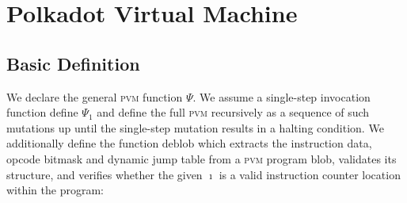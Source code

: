 \section{Polkadot Virtual Machine}\label{sec:virtualmachine}


\subsection{Basic Definition}
\newcommand*{\instr}[1]{\text{{\small \texttt{#1}}}}
\newcommand*{\regs}{\sequence[13]{\pvmreg}}
\newcommand*{\reg}{{\registers}}
\newcommand*{\mem}{{\memory}}
\newcommand*{\memr}{\cyclic{\mem}}
\newcommand*{\memwr}{\cyclic{\mem'}}
\newcommand*{\continue}{\blacktriangleright}
\newcommand*{\instrlen}{\ell}
\newcommand*{\revbitsfunc}[1]{\overleftarrow{\fnoctetstobits}_{#1}}
\newcommand*{\revunbitsfunc}[1]{\revbitsfunc{#1}^{-1}}
\newcommand*{\bitsfunc}[1]{\fnoctetstobits_{#1}}
\newcommand*{\unbitsfunc}[1]{\bitsfunc{#1}^{-1}}
\newcommand*{\bits}[1]{\bitsn{8}{#1}}
\newcommand*{\unbits}[1]{\unbitsn{8}{#1}}
\newcommand*{\bitsn}[2]{\bitsfunc{#1}(#2)}
\newcommand*{\unbitsn}[2]{\unbitsfunc{#1}(#2)}
\newcommand*{\RA}{\token{RA}}
\newcommand*{\SP}{\token{SP}}
\newcommand*{\T}{\token{T}}
\renewcommand*{\S}{\token{S}}
\newcommand*{\A}{\token{A}}
\newcommand*{\basicblocks}{\varpi}
\newcommand*{\instructions}{\zeta}
\newcommand*{\immed}{\nu}
\newcommand*{\deblob}{\text{deblob}}
\newcommand*{\smod}{\text{smod}}
\newcommand*{\rtz}{\text{rtz}}
\newcommand*{\gascostforblock}{\gascounter^{\Delta}}
\newcommand*{\startofbasicblock}{\mathfrak{L}}
We declare the general \textsc{pvm} function $\Psi$. We assume a single-step invocation function define $\Psi_1$ and define the full \textsc{pvm} recursively as a sequence of such mutations up until the single-step mutation results in a halting condition. We additionally define the function $\deblob$ which extracts the instruction data, opcode bitmask and dynamic jump table from a \textsc{pvm} program blob, validates its structure, and verifies whether the given $\imath$ is a valid instruction counter location within the program:
